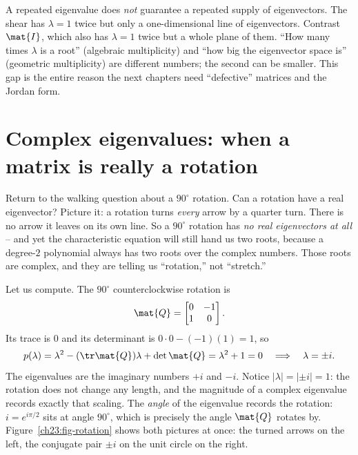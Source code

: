 \begin{trapbox}
A repeated eigenvalue does \emph{not} guarantee a repeated supply of eigenvectors.
The shear has $\lambda=1$ twice but only a one-dimensional line of eigenvectors.
Contrast $\mat{I}$, which also has $\lambda=1$ twice but a whole plane of them.
``How many times $\lambda$ is a root'' (algebraic multiplicity) and ``how big the
eigenvector space is'' (geometric multiplicity) are different numbers; the second
can be smaller. This gap is the entire reason the next chapters need ``defective''
matrices and the Jordan form.
\end{trapbox}

\section{Complex eigenvalues: when a matrix is really a rotation}
\label{ch23:complex}

Return to the walking question about a $90^\circ$ rotation. Can a rotation have a
real eigenvector? Picture it: a rotation turns \emph{every} arrow by a quarter
turn. There is no arrow it leaves on its own line. So a $90^\circ$ rotation has
\emph{no real eigenvectors at all} -- and yet the characteristic equation will
still hand us two roots, because a degree-$2$ polynomial always has two roots over
the complex numbers. Those roots are complex, and they are telling us ``rotation,''
not ``stretch.''

Let us compute. The $90^\circ$ counterclockwise rotation is
\[
  \mat{Q}=\begin{bmatrix}0 & -1\\ 1 & 0\end{bmatrix}.
\]
Its trace is $0$ and its determinant is $0\cdot 0-(-1)(1)=1$, so
\[
  p(\lambda)=\lambda^2-(\tr\mat{Q})\lambda+\det\mat{Q}=\lambda^2+1=0
  \quad\Longrightarrow\quad \lambda=\pm i.
\]
The eigenvalues are the imaginary numbers $+i$ and $-i$. Notice $|\lambda|=|{\pm i}|=1$:
the rotation does not change any length, and the magnitude of a complex eigenvalue
records exactly that scaling. The \emph{angle} of the eigenvalue records the
rotation: $i=e^{i\pi/2}$ sits at angle $90^\circ$, which is precisely the angle
$\mat{Q}$ rotates by. Figure~\ref{ch23:fig-rotation} shows both pictures at once:
the turned arrows on the left, the conjugate pair $\pm i$ on the unit circle on the
right.

